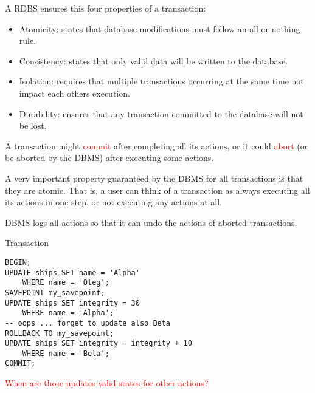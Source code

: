 \documentclass{beamer}
\newcommand{\red}[1]{
\textcolor{red}{#1}
}
\begin{document}
\begin{slide}{
\item A RDBS ensures this four properties of a transaction:
\begin{itemize}
	\item Atomicity: states that database modifications must follow an all or nothing rule.
	\pause
	\item Consistency: states that only valid data will be written to the database.
	\pause
	\item Isolation: requires that multiple transactions occurring at the same time not impact each others execution.
	\pause
	\item Durability: ensures that any transaction committed to the database will not be lost. 	
\end{itemize}
}\end{slide}

\begin{slide}{
\item A transaction might \red{commit} after completing all its actions, or it could \red{abort} (or be aborted by the DBMS) after executing some actions.
\item A very important property guaranteed by the DBMS for all transactions is that they are atomic.  That is, a user can think of a transaction as always executing all its actions in one step, or not executing any actions at all.
\item DBMS logs all actions so that it can undo the actions of aborted transactions.		
}\end{slide}

\begin{frame}[fragile]{Transaction}
\begin{lstlisting}
BEGIN;
UPDATE ships SET name = 'Alpha'
	WHERE name = 'Oleg';
SAVEPOINT my_savepoint;
UPDATE ships SET integrity = 30
	WHERE name = 'Alpha';
-- oops ... forget to update also Beta 
ROLLBACK TO my_savepoint;
UPDATE ships SET integrity = integrity + 10
	WHERE name = 'Beta';
COMMIT;		
\end{lstlisting}
\red{When are those updates valid states for other actions?}  
\end{frame}	
\end{document}
